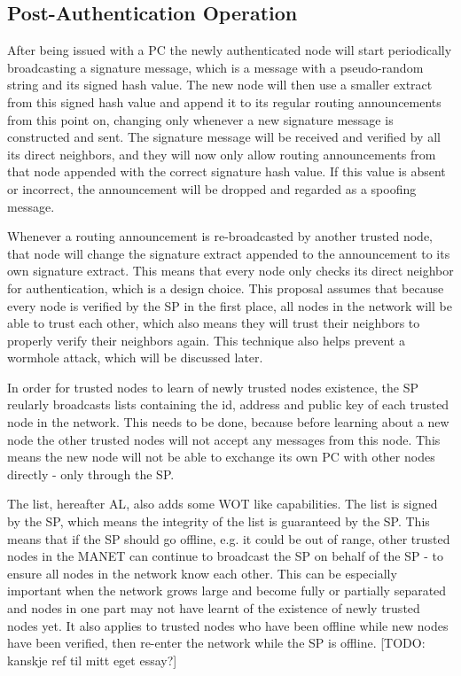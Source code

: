 \subsection{Post-Authentication Operation}
After being issued with a \ac{PC} the newly authenticated node will start
periodically broadcasting a signature message, which is a message with a
pseudo-random string and its signed hash value. The new node will then use a
smaller extract from this signed hash value and append it to its regular routing
announcements from this point on, changing only whenever a new signature
message is constructed and sent. The signature message will be received and
verified by all its direct neighbors, and they will now only allow routing
announcements from that node appended with the correct signature hash value. If
this value is absent or incorrect, the announcement will be dropped and regarded
as a spoofing message.

Whenever a routing announcement is re-broadcasted by another trusted node, that
node will change the signature extract appended to the announcement to its own
signature extract. This means that every node only checks its direct neighbor
for authentication, which is a design choice. This proposal assumes that because
every node is verified by the \ac{SP} in the first place, all nodes in the
network will be able to trust each other, which also means they will trust their
neighbors to properly verify their neighbors again. This technique also helps
prevent a wormhole attack, which will be discussed later.

In order for trusted nodes to learn of newly trusted nodes existence, the
\ac{SP} reularly broadcasts lists containing the id, address and public key of
each trusted node in the network. This needs to be done, because before learning
about a new node the other trusted nodes will not accept any messages from this
node. This means the new node will not be able to exchange its own \ac{PC} with
other nodes directly - only through the \ac{SP}.

The list, hereafter \ac{AL}, also adds some \ac{WOT} like capabilities. The list
is signed by the \ac{SP}, which means the integrity of the list is guaranteed by
the \ac{SP}. This means that if the \ac{SP} should go offline, e.g. it could be
out of range, other trusted nodes in the \ac{MANET} can continue to broadcast
the \ac{SP} on behalf of the \ac{SP} - to ensure all nodes in the network know
each other. This can be especially important when the network grows large and
become fully or partially separated and nodes in one part may not have learnt of
the existence of newly trusted nodes yet. It also applies to trusted nodes who
have been offline while new nodes have been verified, then re-enter the network
while the \ac{SP} is offline. [TODO: kanskje ref til mitt eget essay?]

